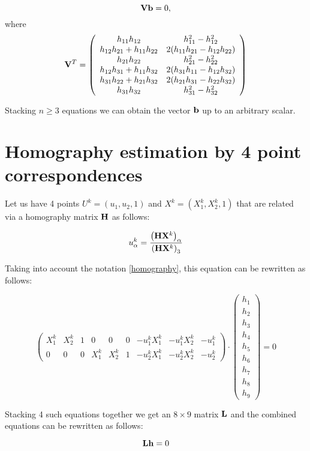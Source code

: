 \documentclass[a4paper,10pt]{article}
\begin{document}
\begin{equation}
 {\bf V}{\bf b} = 0,
\end{equation}
where
{
\begin{equation}
{\bf V}^T = \left(
\begin{array}{cc}
 h_{11}h_{12} &  h_{11}^2 - h_{12}^2\\
 h_{12}h_{21} + h_{11}h_{22} & 2(h_{11}h_{21} - h_{12}h_{22}) \\
 h_{21}h_{22} & h_{21}^2 - h_{22}^2 \\
 h_{12}h_{31} + h_{11}h_{32} & 2(h_{31}h_{11} - h_{12}h_{32}) \\
 h_{31}h_{22} + h_{21}h_{32} & 2(h_{21}h_{31} - h_{22}h_{32}) \\
 h_{31}h_{32} & h_{31}^2 - h_{32}^2
\end{array}\right)
\end{equation}
}

Stacking $n\geq 3$ equations we can obtain the vector ${\bf b}$ up to an arbitrary scalar.


\section{Homography estimation by 4 point correspondences}

Let us have 4 points $U^k=(u_1, u_2, 1)$ and $X^k = (X_1^k, X_2^k, 1)$ that are related via a homography matrix ${\bf H}$ as follows:

\begin{equation}
 u_\alpha^k = \frac{\left({\bf H}{\bf X}^k\right)_\alpha}{\left({\bf H}{\bf X}^k\right)_3}
\end{equation}

Taking into account the notation \eqref{homography}, this equation can be rewritten as follows:

\begin{equation}
 \left(\begin{array}{ccccccccc}
        X^k_1 & X^k_2 & 1 & 0 & 0 & 0 & -u^k_1 X^k_1 & - u^k_1 X^k_2 & -u^k_1\\
        0 & 0 & 0 & X^k_1 & X^k_2 & 1 & -u^k_2 X^k_1 & -u^k_2 X^k_2 & -u^k_2
       \end{array}
\right)\cdot\left(\begin{array}{c}
                              h_1 \\h_2\\h_3\\h_4\\h_5\\h_6\\h_7\\h_8\\h_9
                             \end{array}
\right) = 0
\end{equation}

Stacking 4 such equations together we get an $8\times 9$ matrix ${\bf L}$ and the combined equations can be rewritten as follows:

\begin{equation}
 {\bf L}{\bf h} = 0
\end{equation}
\end{document}
